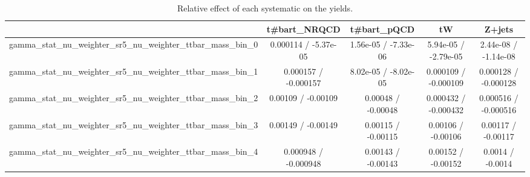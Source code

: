 \documentclass[10pt]{article}
\begin{document}
\begin{table}[htbp]
\begin{center}
\begin{tabular}{|c|c|c|c|c|}
\hline 
      & t#bar{t}_{NRQCD}      & t#bar{t}_{pQCD}      & tW      & Z+jets \\ 
\hline 
  gamma_stat_nu_weighter_sr5_nu_weighter_ttbar_mass_bin_0 & 0.000114 / -5.37e-05 & 1.56e-05 / -7.33e-06 & 5.94e-05 / -2.79e-05 & 2.44e-08 / -1.14e-08 \\ 
  gamma_stat_nu_weighter_sr5_nu_weighter_ttbar_mass_bin_1 & 0.000157 / -0.000157 & 8.02e-05 / -8.02e-05 & 0.000109 / -0.000109 & 0.000128 / -0.000128 \\ 
  gamma_stat_nu_weighter_sr5_nu_weighter_ttbar_mass_bin_2 & 0.00109 / -0.00109 & 0.00048 / -0.00048 & 0.000432 / -0.000432 & 0.000516 / -0.000516 \\ 
  gamma_stat_nu_weighter_sr5_nu_weighter_ttbar_mass_bin_3 & 0.00149 / -0.00149 & 0.00115 / -0.00115 & 0.00106 / -0.00106 & 0.00117 / -0.00117 \\ 
  gamma_stat_nu_weighter_sr5_nu_weighter_ttbar_mass_bin_4 & 0.000948 / -0.000948 & 0.00143 / -0.00143 & 0.00152 / -0.00152 & 0.0014 / -0.0014 \\ 
\hline 
\end{tabular} 
\caption{Relative effect of each systematic on the yields.} 
\end{center} 
\end{table} 
\end{document}

